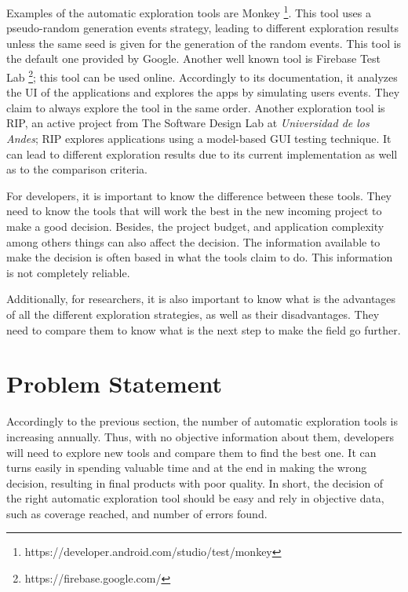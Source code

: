 Examples of the automatic exploration tools are Monkey \footnote{https://developer.android.com/studio/test/monkey}. This tool uses a pseudo-random generation events strategy, leading to different exploration results unless the same seed is given for the generation of the random events. This tool is the default one provided by Google. Another well known tool is Firebase Test Lab \footnote{https://firebase.google.com/}; this tool can be used online. Accordingly to its documentation, it analyzes the UI of the applications and explores the apps by simulating users events. They claim to always explore the tool in the same order. Another exploration tool is RIP, an active project from  The Software Design Lab at \emph{Universidad de los Andes}; RIP explores applications using a model-based GUI testing technique. It can lead to different exploration results due to its current implementation as well as to the comparison criteria. 

For developers, it  is important to know the difference between these tools. They need to know the tools that will work the best in the new incoming project to make a good decision. Besides, the project budget, and application complexity among others things can also affect the decision. The information available to make the decision is often based in what the tools claim to do. This information is not completely reliable.

Additionally, for researchers, it is also important to know what is the advantages of all the different exploration strategies, as well as their disadvantages. They need to compare them to know what is the next step to make the field go further.


\section{Problem Statement}

Accordingly to the previous section, the number of automatic exploration tools is increasing annually. Thus, with no objective information about them, developers  will need to explore new tools and compare them to find the best one. It can turns easily in spending valuable time and at the end in making the wrong decision, resulting in final products with poor quality. In short, the decision of the right automatic exploration tool should be easy and rely in objective data, such as coverage reached, and number of errors found.

